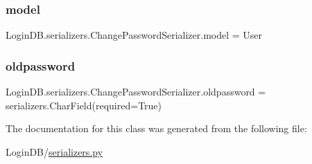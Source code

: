 \subsubsection{\texorpdfstring{model}{model}}
{\footnotesize\ttfamily Login\+D\+B.\+serializers.\+Change\+Password\+Serializer.\+model = User\hspace{0.3cm}{\ttfamily [static]}}

\mbox{\label{class_login_d_b_1_1serializers_1_1_change_password_serializer_a144431e953e6b69f5f85820cb2a3784a}} 
\subsubsection{\texorpdfstring{oldpassword}{oldpassword}}
{\footnotesize\ttfamily Login\+D\+B.\+serializers.\+Change\+Password\+Serializer.\+oldpassword = serializers.\+Char\+Field(required=True)\hspace{0.3cm}{\ttfamily [static]}}



The documentation for this class was generated from the following file\+:\begin{DoxyCompactItemize}
\item 
Login\+D\+B/\hyperlink{serializers_8py}{serializers.\+py}\end{DoxyCompactItemize}
